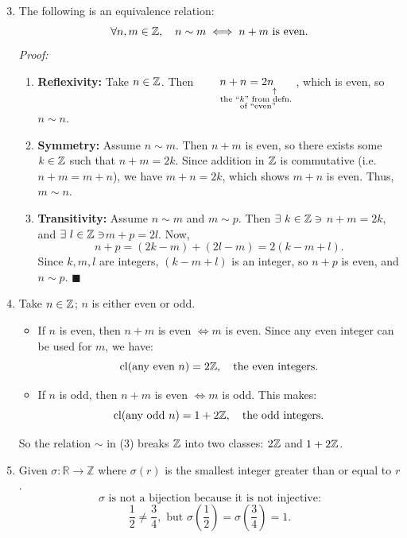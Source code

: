 \begin{enumerate}
    \setcounter{enumi}{2}
    \item The following is an equivalence relation:  
          \[
          \forall n,m \in {\mathbb{Z}}, \quad n \sim m \iff n + m \text{ is even}.
          \]
          \textit{Proof:}  
          \begin{enumerate}
              \item \textbf{Reflexivity:} Take $n \in {\mathbb{Z}}$. Then $\underset{\substack{\ \ \ \ \ \ \ \ \ \ \ \ \ \ \ \uparrow \\ \ \ \ \ \ \ \text{the }``k" \text{ from defn. } \\
              \ \ \ \ \ \ \text{of ``even''}}}{n + n = 2n}$, which is even, so $n \sim n$.
              \item \textbf{Symmetry:} Assume $n \sim m$. Then $n + m$ is even, so there exists some $k \in {\mathbb{Z}}$ such that $n + m = 2k$.  
              Since addition in ${\mathbb{Z}}$ is commutative (i.e. $n+m=m+n$), we have $m + n = 2k$, which shows $m + n$ is even. Thus, $m \sim n$.
              \item \textbf{Transitivity:} Assume $n \sim m$ and $m \sim p$.  
              Then $\exists \ k \in {\mathbb{Z}} \ni $ $n + m = 2k$, and $\exists \ l \in {\mathbb{Z}} \ni $$m + p = 2l$.  
              Now,
              \[
              n + p = (2k - m) + (2l - m) = 2(k - m + l).
              \]
              Since $k, m, l$ are integers, $(k-m+l)$ is an integer, so $n+p$ is even, and $n \sim p$. $\blacksquare$
          \end{enumerate}

    \item Take $n \in {\mathbb{Z}}$; $n$ is either even or odd.  
          \begin{itemize}
              \item If $n$ is even, then $n + m$ is even $\iff m$ is even.  
              Since any even integer can be used for $m$, we have:
              \[
              \text{cl}(\text{any even } n) = 2{\mathbb{Z}}, \quad \text{the even integers.}
              \]
              \item If $n$ is odd, then $n + m$ is even $\iff m$ is odd.  
              This makes:
              \[
              \text{cl}(\text{any odd } n) = 1 + 2{\mathbb{Z}}, \quad \text{the odd integers.}
              \]
          \end{itemize}
          So the relation $\sim$ in (3) breaks ${\mathbb{Z}}$ into two classes: $2{\mathbb{Z}}$ and $1 + 2{\mathbb{Z}}$.

    \item Given $\sigma: \mathbb{R} \to \mathbb{Z}$ where $\sigma(r)$ is the smallest integer greater than or equal to $r$.  
          \[
          \sigma \text{ is not a bijection because it is not injective:}
          \]
          \[
          \frac{1}{2} \neq \frac{3}{4}, \text{ but } \sigma\left(\frac{1}{2}\right) = \sigma\left(\frac{3}{4}\right) = 1.
          \]


\end{enumerate}
